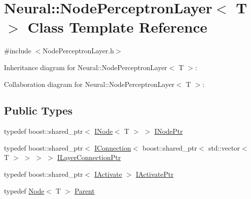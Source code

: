 \hypertarget{class_neural_1_1_node_perceptron_layer}{
\section{Neural::NodePerceptronLayer$<$ T $>$ Class Template Reference}
\label{class_neural_1_1_node_perceptron_layer}
}


{\ttfamily \#include $<$NodePerceptronLayer.h$>$}



Inheritance diagram for Neural::NodePerceptronLayer$<$ T $>$:


Collaboration diagram for Neural::NodePerceptronLayer$<$ T $>$:
\subsection*{Public Types}
\begin{DoxyCompactItemize}
\item 
typedef boost::shared\_\-ptr$<$ \hyperlink{class_neural_1_1_i_node}{INode}$<$ T $>$ $>$ \hyperlink{class_neural_1_1_node_perceptron_layer_a17e54e010c5b9ba97031895320275e6c}{INodePtr}
\item 
typedef boost::shared\_\-ptr$<$ \hyperlink{class_neural_1_1_i_connection}{IConnection}$<$ boost::shared\_\-ptr$<$ std::vector$<$ T $>$ $>$ $>$ $>$ \hyperlink{class_neural_1_1_node_perceptron_layer_a846a430dabc450603ae134904a083750}{ILayerConnectionPtr}
\item 
typedef boost::shared\_\-ptr$<$ \hyperlink{class_neural_1_1_i_activate}{IActivate} $>$ \hyperlink{class_neural_1_1_node_perceptron_layer_a9806fd97604fe80f25365bd676329c5c}{IActivatePtr}
\item 
typedef \hyperlink{class_neural_1_1_node}{Node}$<$ T $>$ \hyperlink{class_neural_1_1_node_perceptron_layer_a927edb9291ccfeae974e6048221ae34b}{Parent}
\end{DoxyCompactItemize}

